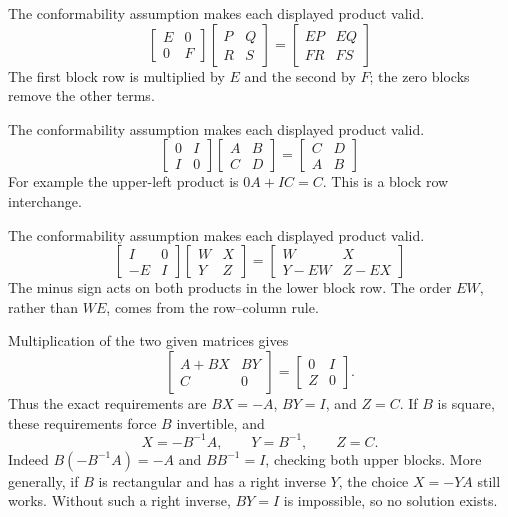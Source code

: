 The conformability assumption makes each displayed product valid.
\[\begin{bmatrix}E&0\\0&F\end{bmatrix}\begin{bmatrix}P&Q\\R&S\end{bmatrix}=\begin{bmatrix}EP&EQ\\FR&FS\end{bmatrix}\]
The first block row is multiplied by $E$ and the second by $F$; the zero blocks remove the other terms.

The conformability assumption makes each displayed product valid.
\[\begin{bmatrix}0&I\\I&0\end{bmatrix}\begin{bmatrix}A&B\\C&D\end{bmatrix}=\begin{bmatrix}C&D\\A&B\end{bmatrix}\]
For example the upper-left product is $0A+IC=C$. This is a block row interchange.

The conformability assumption makes each displayed product valid.
\[\begin{bmatrix}I&0\\-E&I\end{bmatrix}\begin{bmatrix}W&X\\Y&Z\end{bmatrix}=\begin{bmatrix}W&X\\Y-EW&Z-EX\end{bmatrix}\]
The minus sign acts on both products in the lower block row. The order $EW$, rather than $WE$, comes from the row--column rule.

Multiplication of the two given matrices gives
\[\begin{bmatrix}A+BX&BY\\C&0\end{bmatrix}
=\begin{bmatrix}0&I\\Z&0\end{bmatrix}.\]
Thus the exact requirements are $BX=-A$, $BY=I$, and $Z=C$.
If $B$ is square, these requirements force $B$ invertible, and
\[X=-B^{-1}A,\qquad Y=B^{-1},\qquad Z=C.\]
Indeed $B(-B^{-1}A)=-A$ and $BB^{-1}=I$, checking both upper
blocks. More generally, if $B$ is rectangular and has a right inverse
$Y$, the choice $X=-YA$ still works. Without such a right inverse,
$BY=I$ is impossible, so no solution exists.

